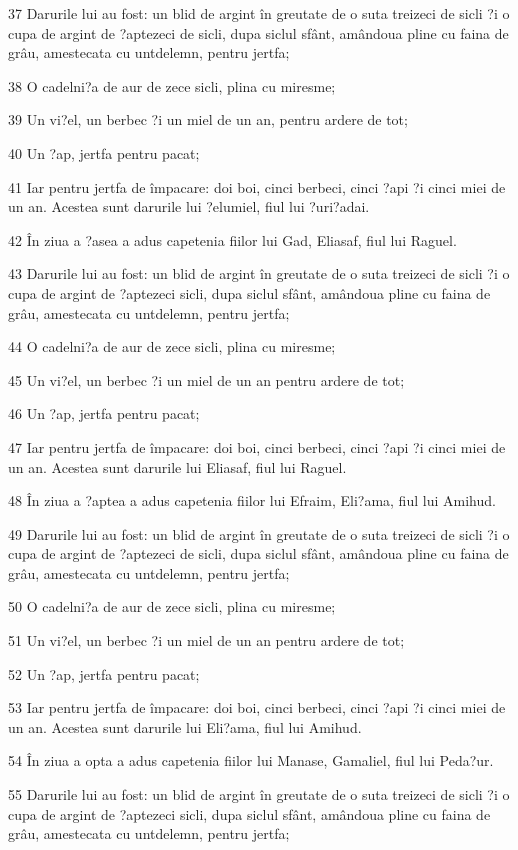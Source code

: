 \par 37 Darurile lui au fost: un blid de argint în greutate de o suta treizeci de sicli ?i o cupa de argint de ?aptezeci de sicli, dupa siclul sfânt, amândoua pline cu faina de grâu, amestecata cu untdelemn, pentru jertfa;
\par 38 O cadelni?a de aur de zece sicli, plina cu miresme;
\par 39 Un vi?el, un berbec ?i un miel de un an, pentru ardere de tot;
\par 40 Un ?ap, jertfa pentru pacat;
\par 41 Iar pentru jertfa de împacare: doi boi, cinci berbeci, cinci ?api ?i cinci miei de un an. Acestea sunt darurile lui ?elumiel, fiul lui ?uri?adai.
\par 42 În ziua a ?asea a adus capetenia fiilor lui Gad, Eliasaf, fiul lui Raguel.
\par 43 Darurile lui au fost: un blid de argint în greutate de o suta treizeci de sicli ?i o cupa de argint de ?aptezeci sicli, dupa siclul sfânt, amândoua pline cu faina de grâu, amestecata cu untdelemn, pentru jertfa;
\par 44 O cadelni?a de aur de zece sicli, plina cu miresme;
\par 45 Un vi?el, un berbec ?i un miel de un an pentru ardere de tot;
\par 46 Un ?ap, jertfa pentru pacat;
\par 47 Iar pentru jertfa de împacare: doi boi, cinci berbeci, cinci ?api ?i cinci miei de un an. Acestea sunt darurile lui Eliasaf, fiul lui Raguel.
\par 48 În ziua a ?aptea a adus capetenia fiilor lui Efraim, Eli?ama, fiul lui Amihud.
\par 49 Darurile lui au fost: un blid de argint în greutate de o suta treizeci de sicli ?i o cupa de argint de ?aptezeci de sicli, dupa siclul sfânt, amândoua pline cu faina de grâu, amestecata cu untdelemn, pentru jertfa;
\par 50 O cadelni?a de aur de zece sicli, plina cu miresme;
\par 51 Un vi?el, un berbec ?i un miel de un an pentru ardere de tot;
\par 52 Un ?ap, jertfa pentru pacat;
\par 53 Iar pentru jertfa de împacare: doi boi, cinci berbeci, cinci ?api ?i cinci miei de un an. Acestea sunt darurile lui Eli?ama, fiul lui Amihud.
\par 54 În ziua a opta a adus capetenia fiilor lui Manase, Gamaliel, fiul lui Peda?ur.
\par 55 Darurile lui au fost: un blid de argint în greutate de o suta treizeci de sicli ?i o cupa de argint de ?aptezeci sicli, dupa siclul sfânt, amândoua pline cu faina de grâu, amestecata cu untdelemn, pentru jertfa;
